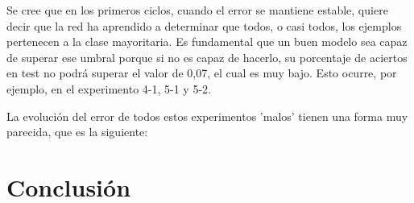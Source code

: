 \documentclass{uc3mpracticas}
\begin{document}
\vspace{2mm}

Se cree que en los primeros ciclos, cuando el error se mantiene estable, quiere decir que la red ha aprendido a determinar que todos, o casi todos, los ejemplos pertenecen a la clase mayoritaria. Es fundamental que un buen modelo sea capaz de superar ese umbral porque si no es capaz de hacerlo, su porcentaje de aciertos en test no podrá superar el valor de 0,07, el cual es muy bajo. Esto ocurre, por ejemplo, en el experimento 4-1, 5-1 y 5-2.

\vspace{1mm}

La evolución del error de todos estos experimentos 'malos' tienen una forma muy parecida, que es la siguiente:



\section{Conclusión}
\end{document}
